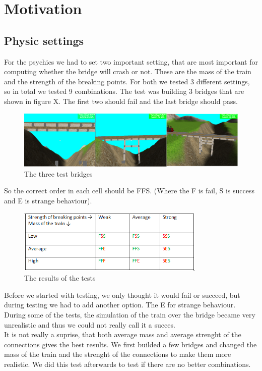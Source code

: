 \section{Motivation}
\subsection{Physic settings}
For the psychics we had to set two important setting, that are most important for computing whether the bridge will crash or not. These are the mass of the train and the strength of the breaking points. For both we tested 3 different settings, so in total we tested 9 combinations. The test was building 3 bridges that are shown in figure X. The first two should fail and the last bridge should pass. \\
\begin{figure}[H]
    \centering
    \includegraphics[width=1.0\textwidth]{screenshots/bridges.png}
    \caption{The three test bridges}
    \label{fig:bridges}
\end{figure}
So the correct order in each cell should be FFS. (Where the F is fail, S is success and E is strange behaviour). \\
\begin{figure}[H]
    \centering
    \includegraphics[width=0.8\textwidth]{screenshots/table.png}
    \caption{The results of the tests}
    \label{fig:table}
\end{figure}
Before we started with testing, we only thought it would fail or succeed, but during testing we had to add another option. The E for strange behaviour. During some of the tests, the simulation of the train over the bridge became very unrealistic and thus we could not really call it a succes. \\
It is not really a suprise, that both average mass and average strenght of the connections gives the best results. We first builded a few bridges and changed the mass of the train and the strenght of the connections to make them more realistic. We did this test afterwards to test if there are no better combinations. \\